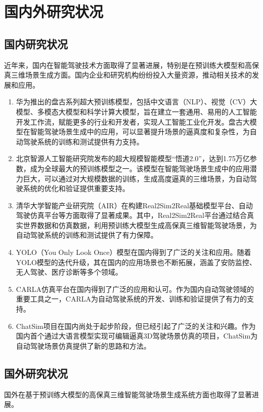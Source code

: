 \documentclass{article}
\begin{document}
\section{国内外研究状况}

\subsection{国内研究状况}
近年来，国内在智能驾驶技术方面取得了显著进展，特别是在预训练大模型和高保真三维场景生成方面。国内企业和研究机构纷纷投入大量资源，推动相关技术的发展和应用。

\begin{enumerate}[label=\arabic*.]
    \item 华为推出的盘古系列超大预训练模型，包括中文语言（NLP）、视觉（CV）大模型、多模态大模型和科学计算大模型，旨在建立一套通用、易用的人工智能开发工作流，赋能更多的行业和开发者，实现人工智能工业化开发。盘古大模型在智能驾驶场景生成中的应用，可以显著提升场景的逼真度和复杂性，为自动驾驶系统的训练和测试提供有力支持。
    \item 北京智源人工智能研究院发布的超大规模智能模型“悟道2.0”，达到1.75万亿参数，成为全球最大的预训练模型之一。该模型在智能驾驶场景生成中的应用潜力巨大，可以通过对大规模数据的训练，生成高度逼真的三维场景，为自动驾驶系统的优化和验证提供重要支持。
    \item 清华大学智能产业研究院（AIR）在构建Real2Sim2Real基础模型平台、自动驾驶仿真平台等方面取得了显著成果。其中，Real2Sim2Real平台通过结合真实世界数据和仿真数据，利用预训练大模型生成高保真三维智能驾驶场景，为自动驾驶系统的训练和测试提供了有力保障。
    \item YOLO（You Only Look Once）模型在国内得到了广泛的关注和应用。随着YOLO模型的迭代升级，其在国内的应用场景也不断拓展，涵盖了安防监控、无人驾驶、医疗诊断等多个领域。
    \item CARLA仿真平台在国内得到了广泛的应用和认可。作为国内自动驾驶领域的重要工具之一，CARLA为自动驾驶系统的开发、训练和验证提供了有力的支持。
    \item ChatSim项目在国内尚处于起步阶段，但已经引起了广泛的关注和兴趣。作为国内首个通过大语言模型实现可编辑逼真3D驾驶场景仿真的项目，ChatSim为自动驾驶场景仿真提供了新的思路和方法。
\end{enumerate}

\subsection{国外研究状况}
国外在基于预训练大模型的高保真三维智能驾驶场景生成系统方面也取得了显著进展。
\end{document}
